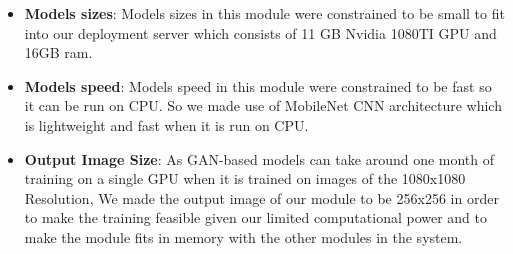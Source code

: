 \begin{itemize}
    \item \textbf{Models sizes}: Models sizes in this module were constrained to be small to fit into our deployment server which consists of 11 GB Nvidia 1080TI GPU and 16GB ram.
    
    \item \textbf{Models speed}: Models speed in this module were constrained to be fast so it can be run on CPU. So we made use of MobileNet CNN architecture which is lightweight and fast when it is run on CPU.
    
    \item \textbf{Output Image Size}: As GAN-based models can take around one month of training on a single GPU when it is trained on images of the 1080x1080 Resolution, We made the output image of our module to be 256x256 in order to make the training feasible given our limited computational power and to make the module fits in memory with the other modules in the system. 
    
\end{itemize}
